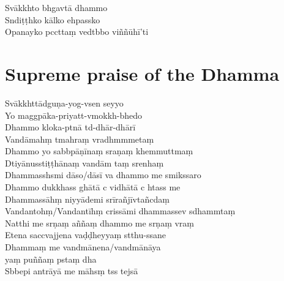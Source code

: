 \begin{leader}
\end{leader}

Svākkhto bhgavtā dhammo\\
Sndiṭṭhko kālko ehpassko\\
Opanayko pccttaṃ vedtbbo viññūhī'ti


\chapter{Supreme praise of the Dhamma}%

\begin{leader}
\end{leader}

Svākkhttādguṇa-yog-vsen seyyo\\
Yo maggpāka-priyatt-vmokkh-bhedo\\
Dhammo kloka-ptnā td-dhār-dhārī\\
Vandāmahṃ tmahraṃ vradhmmmetaṃ\\
Dhammo yo sabbpāṇīnaṃ sraṇaṃ khemmuttmaṃ\\
Dtiyānusstiṭṭhānaṃ vandām taṃ srenhaṃ\\
Dhammasshsmi dāso/dāsī va dhammo me smikssaro\\
Dhammo dukkhass ghātā c vidhātā c htass me\\
Dhammassāhṃ niyyādemi srīrañjīvtañcdaṃ\\
Vandantohṃ/Vandantīhṃ crissāmi dhammassev sdhammtaṃ\\
Natthi me srṇaṃ aññaṃ dhammo me srṇaṃ vraṃ\\
Etena saccvajjena vaḍḍheyyaṃ stthu-ssane\\
Dhammaṃ me vandmānena/vandmānāya\\
\vin yaṃ puññaṃ pstaṃ dha\\
Sbbepi antrāyā me māhsṃ tss tejsā

